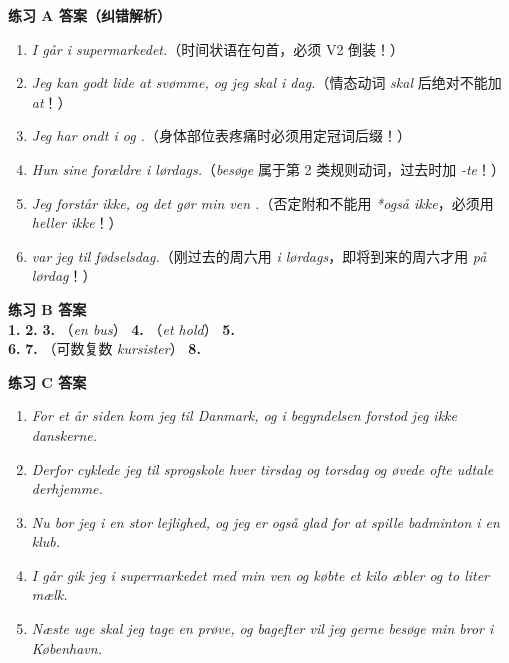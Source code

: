 \begin{answerbox}
\textbf{练习 A 答案（纠错解析）}
\begin{enumerate}
  \item \textit{I går  i supermarkedet.}（时间状语在句首，必须 V2 倒装！）
  \item \textit{Jeg kan godt lide at svømme, og jeg skal  i dag.}（情态动词 \textit{skal} 后绝对不能加 \textit{at}！）
  \item \textit{Jeg har ondt i  og .}（身体部位表疼痛时必须用定冠词后缀！）
  \item \textit{Hun  sine forældre i lørdags.}（\textit{besøge} 属于第 2 类规则动词，过去时加 \textit{-te}！）
  \item \textit{Jeg forstår ikke, og det gør min ven .}（否定附和不能用 \textit{*også ikke}，必须用 \textit{heller ikke}！）
  \item \textit{ var jeg til fødselsdag.}（刚过去的周六用 \textit{i lørdags}，即将到来的周六才用 \textit{på lørdag}！）
\end{enumerate}

\textbf{练习 B 答案}\\
\textbf{1.}  \quad \textbf{2.}  \quad \textbf{3.} （\textit{en bus}） \quad \textbf{4.} （\textit{et hold}） \quad \textbf{5.} \\
\textbf{6.}  \quad \textbf{7.} （可数复数 \textit{kursister}） \quad \textbf{8.} 

\vspace{0.2em}

\textbf{练习 C 答案}
\begin{enumerate}
  \item \textit{For et år siden kom jeg til Danmark, og i begyndelsen forstod jeg ikke danskerne.}
  \item \textit{Derfor cyklede jeg til sprogskole hver tirsdag og torsdag og øvede ofte udtale derhjemme.}
  \item \textit{Nu bor jeg i en stor lejlighed, og jeg er også glad for at spille badminton i en klub.}
  \item \textit{I går gik jeg i supermarkedet med min ven og købte et kilo æbler og to liter mælk.}
  \item \textit{Næste uge skal jeg tage en prøve, og bagefter vil jeg gerne besøge min bror i København.}
\end{enumerate}


\end{answerbox}
